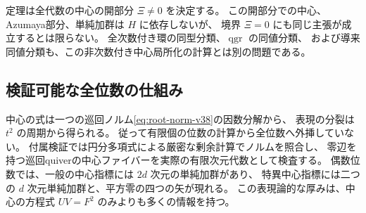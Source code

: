 \begin{remark}[全代数とchartの区別]
定理は全代数の中心の開部分 $\Xi\ne0$ を決定する。
この開部分での中心、Azumaya部分、単純加群は $H$ に依存しないが、
境界 $\Xi=0$ にも同じ主張が成立するとは限らない。
全次数付き環の同型分類、$\operatorname{qgr}$ の同値分類、
および導来同値分類も、この非次数付き中心局所化の計算とは別の問題である。
\end{remark}

\subsection{検証可能な全位数の仕組み}

中心の式は一つの巡回ノルム\eqref{eq:root-norm-v38}の因数分解から、
表現の分裂は $t^2$ の周期から得られる。
従って有限個の位数の計算から全位数へ外挿していない。
付属検証では円分多項式による厳密な剰余計算でノルムを照合し、
零辺を持つ巡回quiverの中心ファイバーを実際の有限次元代数として検査する。
偶数位数では、一般の中心指標には $2d$ 次元の単純加群があり、
特異中心指標には二つの $d$ 次元単純加群と、平方零の四つの矢が現れる。
この表現論的な厚みは、中心の方程式 $UV=F^2$ のみよりも多くの情報を持つ。
